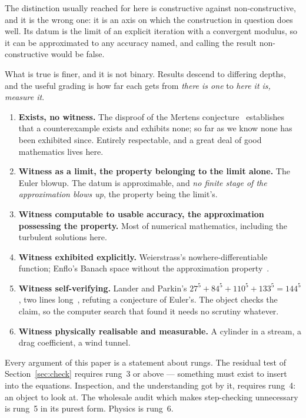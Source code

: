 \documentclass[11pt]{article}
\begin{document}
The distinction usually reached for here is constructive against non-constructive, and it is the
wrong one: it is an axis on which the construction in question does well. Its datum is the limit of
an explicit iteration with a convergent modulus, so it can be approximated to any accuracy named, and
calling the result non-constructive would be false.

What is true is finer, and it is not binary. Results descend to differing depths, and the useful
grading is how far each gets from \emph{there is one} to \emph{here it is, measure it}.

\begin{enumerate}
\item \textbf{Exists, no witness.} The disproof of the Mertens conjecture~\cite{mertens} establishes
that a counterexample exists and exhibits none; so far as we know none has been exhibited since.
Entirely respectable, and a great deal of good mathematics lives here.
\item \textbf{Witness as a limit, the property belonging to the limit alone.} The Euler blowup. The
datum is approximable, and \emph{no finite stage of the approximation blows up}, the property being
the limit's.
\item \textbf{Witness computable to usable accuracy, the approximation possessing the property.}
Most of numerical mathematics, including the turbulent solutions here.
\item \textbf{Witness exhibited explicitly.} Weierstrass's nowhere-differentiable
function; Enflo's Banach space without the approximation property~\cite{enflo}.
\item \textbf{Witness self-verifying.} Lander and Parkin's $27^5+84^5+110^5+133^5=144^5$, two lines
long~\cite{landerparkin}, refuting a conjecture of Euler's. The object checks the claim, so the
computer search that found it needs no scrutiny whatever.
\item \textbf{Witness physically realisable and measurable.} A cylinder in a stream, a drag
coefficient, a wind tunnel.
\end{enumerate}

Every argument of this paper is a statement about rungs. The residual test of
Section~\ref{sec:check} requires rung~3 or above --- something must exist to insert into the
equations. Inspection, and the understanding got by it, requires rung~4: an object to look at.
The wholesale audit which makes step-checking unnecessary is rung~5 in its purest form. Physics is
rung~6.
\end{document}
